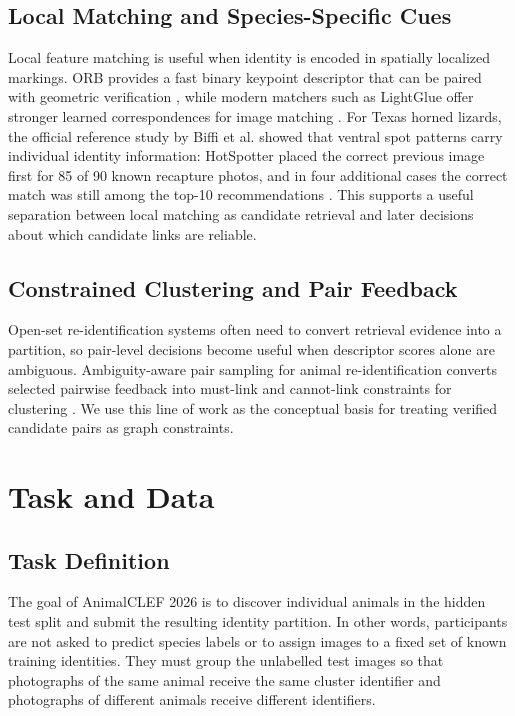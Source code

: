 \documentclass{ceurart}
\begin{document}
\subsection{Local Matching and Species-Specific Cues}
Local feature matching is useful when identity is encoded in spatially localized markings. ORB provides a fast binary keypoint descriptor that can be paired with geometric verification \cite{orb}, while modern matchers such as LightGlue offer stronger learned correspondences for image matching \cite{lightglue}. For Texas horned lizards, the official reference study by Biffi et al. showed that ventral spot patterns carry individual identity information: HotSpotter placed the correct previous image first for 85 of 90 known recapture photos, and in four additional cases the correct match was still among the top-10 recommendations \cite{biffi2025identification}. This supports a useful separation between local matching as candidate retrieval and later decisions about which candidate links are reliable.

\subsection{Constrained Clustering and Pair Feedback}
Open-set re-identification systems often need to convert retrieval evidence into a partition, so pair-level decisions become useful when descriptor scores alone are ambiguous. Ambiguity-aware pair sampling for animal re-identification converts selected pairwise feedback into must-link and cannot-link constraints for clustering \cite{sani2026active}. We use this line of work as the conceptual basis for treating verified candidate pairs as graph constraints.

\section{Task and Data}
\subsection{Task Definition}
The goal of AnimalCLEF 2026 is to discover individual animals in the hidden test split and submit the resulting identity partition. In other words, participants are not asked to predict species labels or to assign images to a fixed set of known training identities. They must group the unlabelled test images so that photographs of the same animal receive the same cluster identifier and photographs of different animals receive different identifiers.
\end{document}
